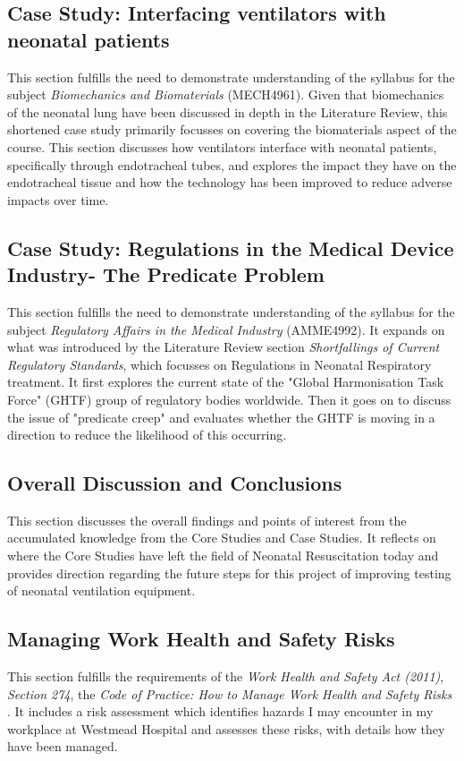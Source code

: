 \documentclass[12pt, openany, oneside]{book}
\begin{document}
\subsection{Case Study: Interfacing ventilators with neonatal patients}
This section fulfills the need to demonstrate understanding of the syllabus for the subject \textit{Biomechanics and Biomaterials} (MECH4961). Given that biomechanics of the neonatal lung have been discussed in depth in the Literature Review, this shortened case study primarily focusses on covering the biomaterials aspect of the course. This section discusses how ventilators interface with neonatal patients, specifically through endotracheal tubes, and explores the impact they have on the endotracheal tissue and how the technology has been improved to reduce adverse impacts over time.

\subsection{Case Study: Regulations in the Medical Device Industry- The Predicate Problem}
This section fulfills the need to demonstrate understanding of the syllabus for the subject \textit{Regulatory Affairs in the Medical Industry} (AMME4992). It expands on what was introduced by the Literature Review section \textit{Shortfallings of Current Regulatory Standards}, which focusses on Regulations in Neonatal Respiratory treatment. It first explores the current state of the "Global Harmonisation Task Force" (GHTF) group of regulatory bodies worldwide. Then it goes on to discuss the issue of "predicate creep" and evaluates whether the GHTF is moving in a direction to reduce the likelihood of this occurring.



\subsection{Overall Discussion and Conclusions}
This section discusses the overall findings and points of interest from the accumulated knowledge from the Core Studies and Case Studies. It reflects on where the Core Studies have left the field of Neonatal Resuscitation today and provides direction regarding the future steps for this project of improving testing of neonatal ventilation equipment.

\subsection{Managing Work Health and Safety Risks}
This section fulfills the requirements of the \textit{Work Health and Safety Act (2011)}, \textit{Section 274}, the \textit{Code of Practice: How to Manage Work Health and Safety Risks} \cite{whs2011}. It includes a risk assessment which identifies hazards I may encounter in my workplace at Westmead Hospital and assesses these risks, with details how they have been managed.
\end{document}
